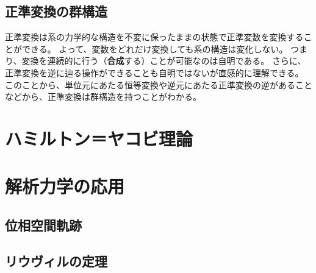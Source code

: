 \documentclass[a4paper]{jsreport}
\begin{document}
        \section{正準変換の群構造}
            正準変換は系の力学的な構造を不変に保ったままの状態で正準変数を変換することができる。
            よって、変数をどれだけ変換しても系の構造は変化しない。
            つまり、変換を連続的に行う（\textbf{合成}する）ことが可能なのは自明である。
            さらに、正準変換を逆に辿る操作ができることも自明ではないが直感的に理解できる。
            このことから、単位元にあたる恒等変換や逆元にあたる正準変換の逆があることなどから、正準変換は群構造を持つことがわかる。

    \chapter{ハミルトン＝ヤコビ理論}

    \chapter{解析力学の応用}
        \section{位相空間軌跡}
        \section{リウヴィルの定理}
\end{document}
